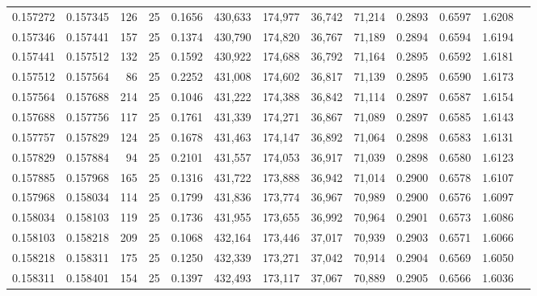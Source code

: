 \begin{tabular}{rrrrrrrrrrrrr}
0.157272 & 0.157345 &   126 &  25 &                                     0.1656 & 430,633 & 174,977 &  36,742 &  71,214 & 0.2893 & 0.6597 & 1.6208 \\
0.157346 & 0.157441 &   157 &  25 &                                     0.1374 & 430,790 & 174,820 &  36,767 &  71,189 & 0.2894 & 0.6594 & 1.6194 \\
0.157441 & 0.157512 &   132 &  25 &                                     0.1592 & 430,922 & 174,688 &  36,792 &  71,164 & 0.2895 & 0.6592 & 1.6181 \\
0.157512 & 0.157564 &    86 &  25 &                                     0.2252 & 431,008 & 174,602 &  36,817 &  71,139 & 0.2895 & 0.6590 & 1.6173 \\
0.157564 & 0.157688 &   214 &  25 &                                     0.1046 & 431,222 & 174,388 &  36,842 &  71,114 & 0.2897 & 0.6587 & 1.6154 \\
0.157688 & 0.157756 &   117 &  25 &                                     0.1761 & 431,339 & 174,271 &  36,867 &  71,089 & 0.2897 & 0.6585 & 1.6143 \\
0.157757 & 0.157829 &   124 &  25 &                                     0.1678 & 431,463 & 174,147 &  36,892 &  71,064 & 0.2898 & 0.6583 & 1.6131 \\
0.157829 & 0.157884 &    94 &  25 &                                     0.2101 & 431,557 & 174,053 &  36,917 &  71,039 & 0.2898 & 0.6580 & 1.6123 \\
0.157885 & 0.157968 &   165 &  25 &                                     0.1316 & 431,722 & 173,888 &  36,942 &  71,014 & 0.2900 & 0.6578 & 1.6107 \\
0.157968 & 0.158034 &   114 &  25 &                                     0.1799 & 431,836 & 173,774 &  36,967 &  70,989 & 0.2900 & 0.6576 & 1.6097 \\
0.158034 & 0.158103 &   119 &  25 &                                     0.1736 & 431,955 & 173,655 &  36,992 &  70,964 & 0.2901 & 0.6573 & 1.6086 \\
0.158103 & 0.158218 &   209 &  25 &                                     0.1068 & 432,164 & 173,446 &  37,017 &  70,939 & 0.2903 & 0.6571 & 1.6066 \\
0.158218 & 0.158311 &   175 &  25 &                                     0.1250 & 432,339 & 173,271 &  37,042 &  70,914 & 0.2904 & 0.6569 & 1.6050 \\
0.158311 & 0.158401 &   154 &  25 &                                     0.1397 & 432,493 & 173,117 &  37,067 &  70,889 & 0.2905 & 0.6566 & 1.6036 \\

\end{tabular}
